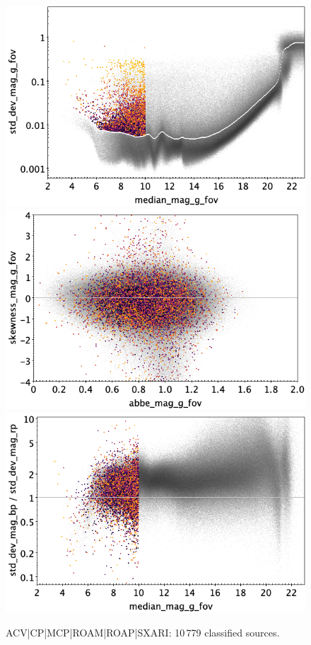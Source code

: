 \documentclass[longauth]{aa}
\begin{document}
\begin{appendix}
\begin{figure}
\hspace{2mm}
 \includegraphics[width=0.45\hsize]{figures/appendix/ACV_cls_msd.png} \\ %
\vspace{4mm}
 \includegraphics[width=0.45\hsize]{figures/appendix/ACV_cls_ask.png}  %
\hspace{2mm}
 \includegraphics[width=0.45\hsize]{figures/appendix/ACV_cls_msdr.png}  \\ %
\vspace{4mm}
 \caption{ACV|CP|MCP|ROAM|ROAP|SXARI: 10\,779 classified sources.}  
 \label{fig:app:ACV}
\end{figure}


\end{appendix}
\end{document}
